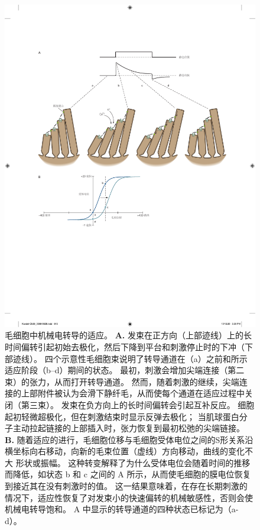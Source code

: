 \begin{figure}[htbp]
	\centering
	\includegraphics[width=1.0\linewidth]{chap26/fig_26_12}
	\caption{毛细胞中机械电转导的适应。
		\textbf{A.} 发束在正方向（上部迹线）上的长时间偏转引起初始去极化，然后下降到平台和刺激停止时的下冲（下部迹线）。
		四个示意性毛细胞束说明了转导通道在（a）之前和所示适应阶段（b–d）期间的状态。
		最初，刺激会增加尖端连接（第二束）的张力，从而打开转导通道。 然而，随着刺激的继续，尖端连接的上部附件被认为会滑下静纤毛，从而使每个通道在适应过程中关闭（第三束）。
		发束在负方向上的长时间偏转会引起互补反应。
		细胞起初轻微超极化，但在刺激结束时显示反弹去极化；
		当肌球蛋白分子主动拉起链接的上部插入时，张力恢复到最初松弛的尖端链接。
		\textbf{B.} 随着适应的进行，毛细胞位移与毛细胞受体电位之间的S形关系沿横坐标向右移动，向新的毛束位置（虚线）方向移动，曲线的变化不大 形状或振幅。
		这种转变解释了为什么受体电位会随着时间的推移而降低，如状态 b 和 c 之间的 A 所示，从而使毛细胞的膜电位恢复到接近其在没有刺激时的值。
		这一结果意味着，在存在长期刺激的情况下，适应性恢复了对发束小的快速偏转的机械敏感性，否则会使机械电转导饱和。
		A 中显示的转导通道的四种状态已标记为（a-d）\cite{hudspeth1994pulling}。}
	\label{fig:26_12}
\end{figure}


